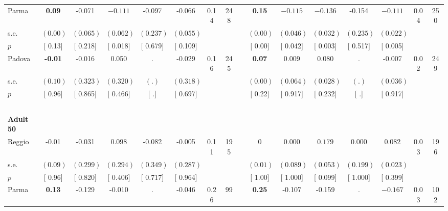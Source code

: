 \begin{longtable}{L{8em} c c c c c c c p{1em} c c c c c c c}
\quad \quad \quad Parma& \textbf{     0.09} &    -0.071 & $ \mathbf{   -0.111}$ &    -0.097 &    -0.066 &      0.14 &       248 & & \textbf{     0.15} & $ \mathbf{   -0.115}$ & $ \mathbf{   -0.136}$ &    -0.154 & $ \mathbf{   -0.111}$ &      0.04 &       250  \\*
\quad \quad \quad \quad s.e.& $ (     0.00)$ & $ (    0.065)$ & $ (    0.062)$ & $ (    0.237)$ & $ (    0.055)$ & & & & $ (     0.00)$ & $ (    0.046)$ & $ (    0.032)$ & $ (    0.235)$ & $ (    0.022)$ & &  \\*
\quad \quad \quad \quad $ p$ & [     0.13] & [    0.218] & [    0.018] & [    0.679] & [    0.109] & & & & [     0.00] & [    0.042] & [    0.003] & [    0.517] & [    0.005] & &  \\[1em]
\quad \quad \quad Padova& \textbf{    -0.01} &    -0.016 &     0.050 &         . &    -0.029 &      0.16 &       245 & & \textbf{     0.07} &     0.009 &     0.080 &         . &    -0.007 &      0.02 &       249  \\*
\quad \quad \quad \quad s.e.& $ (     0.10)$ & $ (    0.323)$ & $ (    0.320)$ & $ (        .)$ & $ (    0.318)$ & & & & $ (     0.00)$ & $ (    0.064)$ & $ (    0.028)$ & $ (        .)$ & $ (    0.036)$ & &  \\*
\quad \quad \quad \quad $ p$ & [     0.96] & [    0.865] & [    0.466] & [        .] & [    0.697] & & & & [     0.22] & [    0.917] & [    0.232] & [        .] & [    0.917] & &  \\[1em]
~\\[1em]
\quad \quad \textbf{Adult 50} & & & & & & & & & & & & & & & \\* 
\quad \quad \quad Reggio& -0.01 &    -0.031 &     0.098 &    -0.082 &    -0.005 &      0.11 &       195 & & 0 &     0.000 & $ \mathbf{    0.179}$ &     0.000 &     0.082 &      0.03 &       196  \\*
\quad \quad \quad \quad s.e.& $ (     0.09)$ & $ (    0.299)$ & $ (    0.294)$ & $ (    0.349)$ & $ (    0.287)$ & & & & $ (     0.01)$ & $ (    0.089)$ & $ (    0.053)$ & $ (    0.199)$ & $ (    0.023)$ & &  \\*
\quad \quad \quad \quad $ p$ & [     0.96] & [    0.820] & [    0.406] & [    0.717] & [    0.964] & & & & [     1.00] & [    1.000] & [    0.099] & [    1.000] & [    0.399] & &  \\[1em]
\quad \quad \quad Parma& \textbf{     0.13} &    -0.129 &    -0.010 &         . &    -0.046 &      0.26 &        99 & & \textbf{     0.25} &    -0.107 &    -0.159 &         . & $ \mathbf{   -0.167}$ &      0.03 &       102  \\*

\end{longtable}
